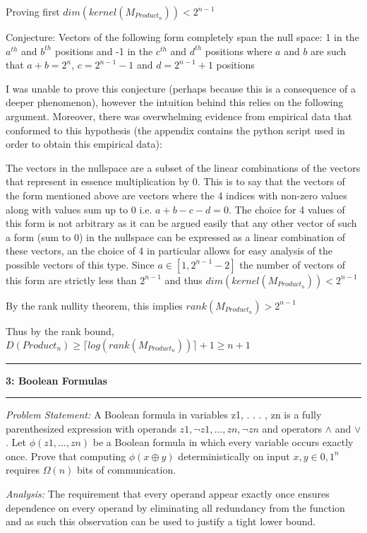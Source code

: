 \documentclass[11pt]{article}
\newcommand\question[2]{\vspace{.25in}\hrule\textbf{#1: #2}\vspace{.5em}\hrule\vspace{.10in}}
\newcommand\analysis{\vspace{.10in}\emph{Analysis: }\newline}
\newcommand\problem{\emph{Problem Statement:}\newline}
\begin{document}
\proof
Proving first $dim(kernel(M_{Product_n})) < 2^{n - 1}$

Conjecture: Vectors of the following form completely span the null space:
1 in the $a^{th}$ and $b^{th}$  positions and -1 in the $c^{th}$ and $d^{th}$ positions where $a$ and $b$ are such that $a + b = 2^n$, $c = 2^{n-1} - 1$ and $d = 2^{n-1} + 1$ positions 

I was unable to prove this conjecture (perhaps because this is a consequence of a deeper phenomenon), however the intuition behind this relies on the following argument. Moreover, there was overwhelming evidence from empirical data that conformed to this hypothesis (the appendix contains the python script used in order to obtain this empirical data):

The vectors in the nullspace are a subset of the linear combinations of the vectors that represent in essence multiplication by 0. This is to say that the vectors of the form mentioned above are vectors where the 4 indices with non-zero values along with values sum up to 0 i.e. $a + b - c - d = 0$. The choice for 4 values of this form is not arbitrary as it can be argued easily that any other vector of such a form (sum to 0) in the nullspace can be expressed as a linear combination of these vectors, an the choice of 4 in particular allows for easy analysis of the possible vectors of this type. Since $a \in [1, 2^{n - 1} - 2]$ the number of vectors of this form are strictly less than $2^{n - 1}$ and thus $dim(kernel(M_{Product_n})) < 2^{n - 1}$

By the rank nullity theorem, this implies $rank(M_{Product_n}) > 2 ^ {n - 1}$

Thus by the rank bound, $D(Product_n) \geq \lceil log(rank(M_{Product_n})) \rceil + 1 \geq n + 1$

\newpage

\question{3}{Boolean Formulas} 

\problem
A Boolean formula in variables z1, . . . , zn is a fully
parenthesized expression with operands $z1, \lnot z1, . . . , zn, \lnot zn$ and operators $\land$ and $\lor$. Let $\phi (z1, . . . , zn)$ be a Boolean formula in which every variable occurs exactly once. Prove that computing $\phi (x \oplus y)$ deterministically on input $x, y \in {0, 1}^n$
requires
$\Omega(n)$ bits of communication.

\analysis
The requirement that every operand appear exactly once ensures dependence on every operand by eliminating all redundancy from the function and as such this observation can be used to justify a tight lower bound. 
\end{document}
